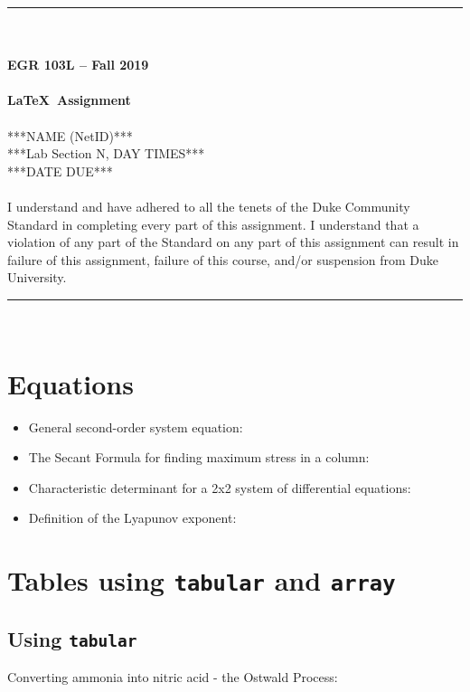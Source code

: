 \documentclass{article}
\begin{document}
\begin{center}
\rule{6.5in}{0.5mm}\\~\\
\textbf{\large EGR 103L -- Fall 2019}\\~\\
\textbf{\huge \LaTeX~Assignment}\\~\\
***NAME (NetID)***\\ 
***Lab Section N, DAY TIMES***\\
***DATE DUE***\\~\\
{\small I understand and have adhered to all the tenets of the Duke
  Community Standard in completing every part of this assignment.  I
  understand that a violation of any part of the Standard on any part
  of this assignment can result in failure of this assignment, failure
  of this course, and/or suspension from Duke University.} 
\rule{6.5in}{0.5mm}\\
\end{center}
\tableofcontents
\listoffigures
\pagebreak

\section{Equations} %
\begin{itemize}
\item General second-order system equation\cite[p.~221]{Rizzoni}:
\item The Secant Formula for finding maximum stress 
in a column\cite[p.~681]{Hibbeler}:
\item Characteristic determinant for a 2x2 system of 
differential equations\cite[p.~152]{Kreyszig}:
\item Definition of the Lyapunov exponent\cite[p.~56]{Ott}:
\end{itemize}



\section{Tables using \texttt{tabular} and \texttt{array}}
\subsection{Using \texttt{tabular}} %
Converting ammonia into nitric acid - the Ostwald Process\cite{Ostwald}:
\end{document}
